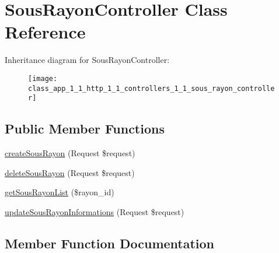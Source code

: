 \hypertarget{class_app_1_1_http_1_1_controllers_1_1_sous_rayon_controller}{}\section{Sous\+Rayon\+Controller Class Reference}
\label{class_app_1_1_http_1_1_controllers_1_1_sous_rayon_controller}
Inheritance diagram for Sous\+Rayon\+Controller\+:\begin{figure}[H]
\begin{center}
\leavevmode
\texttt{[image: class\_app\_1\_1\_http\_1\_1\_controllers\_1\_1\_sous\_rayon\_controller]}
\end{center}
\end{figure}
\subsection*{Public Member Functions}
\begin{DoxyCompactItemize}
\item 
\mbox{\hyperlink{class_app_1_1_http_1_1_controllers_1_1_sous_rayon_controller_a02068bc856d70df214af1259fe7d444e}{create\+Sous\+Rayon}} (Request \$request)
\item 
\mbox{\hyperlink{class_app_1_1_http_1_1_controllers_1_1_sous_rayon_controller_a90bc5db53772269f9377937c3a013c4c}{delete\+Sous\+Rayon}} (Request \$request)
\item 
\mbox{\hyperlink{class_app_1_1_http_1_1_controllers_1_1_sous_rayon_controller_a92e4ea10d05aaaf6c05345c4900254fd}{get\+Sous\+Rayon\+List}} (\$rayon\+\_\+id)
\item 
\mbox{\hyperlink{class_app_1_1_http_1_1_controllers_1_1_sous_rayon_controller_a4d332bfc1099e205f953a2a6bc8ad71e}{update\+Sous\+Rayon\+Informations}} (Request \$request)
\end{DoxyCompactItemize}


\subsection{Member Function Documentation}
\mbox{\label{class_app_1_1_http_1_1_controllers_1_1_sous_rayon_controller_a02068bc856d70df214af1259fe7d444e}} 
